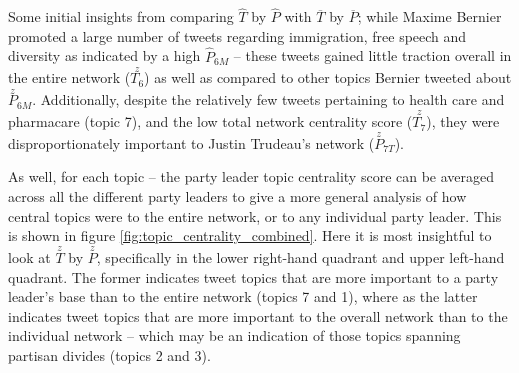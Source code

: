 Some initial insights from comparing \textbf{$\hat{T}$} by \textbf{$\hat{P}$}
with \textbf{$\overline{T}$} by \textbf{$\overline{P}$}; while Maxime Bernier
promoted a large number of tweets regarding immigration, free speech and
diversity as indicated by a high $\hat{P}_{6M}$ -- these tweets gained little
traction overall in the entire network ($\stackrel{z}{T_{6}}$) as well as compared to
other topics Bernier tweeted about $\stackrel{z}{P}_{6M}$. Additionally, despite
the relatively few tweets pertaining to health care and pharmacare (topic 7),
and the low total network centrality score ($\stackrel{z}{T_{7}}$), they were
disproportionately important to Justin Trudeau's network
($\stackrel{z}{P}_{7T}$).

As well, for each topic -- the party leader topic centrality score can be
averaged across all the different party leaders to give a more general analysis
of how central topics were to the entire network, or to any individual party leader.
This is shown in figure \ref{fig:topic_centrality_combined}. Here it is most
insightful to look at \textbf{$\stackrel{z}{T}$} by \textbf{$\stackrel{z}{P}$},
specifically in the lower right-hand quadrant and upper left-hand quadrant. The
former indicates tweet topics that are more important to a party leader's base than to the
entire network (topics 7 and 1), where as the latter indicates tweet topics that
are more important to the overall network than to the individual network --
which may be an indication of those topics spanning partisan divides (topics 2
and 3).

